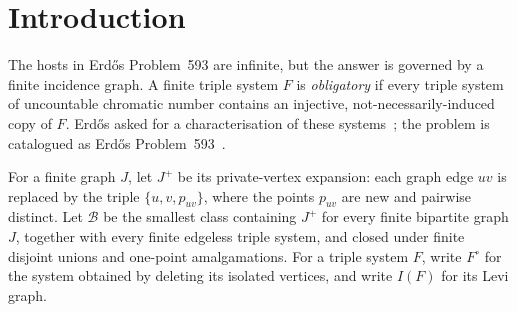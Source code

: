 
\begin{abstract}
A finite triple system is \emph{obligatory} if it embeds in every triple system
of uncountable chromatic number.  We give an alternative proof of the complete
classification.  After isolated vertices are removed, obligatoriness is
equivalent to the following three finite conditions: the system is linear,
every hyperedge-node of its Levi graph is incident with a bridge, and every
Berge cycle has even length.  Equivalently, the obligatory systems are obtained
from private-vertex expansions of finite bipartite graphs and finite edgeless
systems by finite disjoint unions and one-point amalgamations.  The proof
separates the finite bridge-block decomposition from the infinitary host
constructions: deleting the Levi bridges produces bipartite expansion pieces
attached along a quotient forest, while a one-apex lift supplies avoiding hosts
for the missing-bridge and odd-cycle obstructions.  The same decomposition gives
sharp finite parameter consequences.  A reduced obligatory system with
$m\ge1$ hyperedges and $1\le c\le m$ connected components has order $n$ if and
only if
\[
  m+2(c-1)+\left\lceil2\sqrt{m-c+1}\right\rceil
  \le n\le 2m+c.
\]
A Lean~4 development verifies both directions of the finite classification and
the isolated-vertex reduction.  All arguments are in ZFC.
\end{abstract}

\section*{Introduction}\label{introduction-reader-first}

The hosts in Erd\H{o}s Problem~593 are infinite, but the answer is governed by a
finite incidence graph.  A finite triple system $F$ is \emph{obligatory} if
every triple system of uncountable chromatic number contains an injective,
not-necessarily-induced copy of $F$.  Erd\H{o}s asked for a characterisation of
these systems~\citep{erdos1995}; the problem is catalogued as Erd\H{o}s
Problem~593~\citep{bloom593}.

For a finite graph $J$, let $J^+$ be its private-vertex expansion: each graph
edge $uv$ is replaced by the triple $\{u,v,p_{uv}\}$, where the points $p_{uv}$
are new and pairwise distinct.  Let $\mathcal B$ be the smallest class
containing $J^+$ for every finite bipartite graph $J$, together with every
finite edgeless triple system, and closed under finite disjoint unions and
one-point amalgamations.  For a triple system $F$, write $F^\circ$ for the
system obtained by deleting its isolated vertices, and write $I(F)$ for its
Levi graph.

